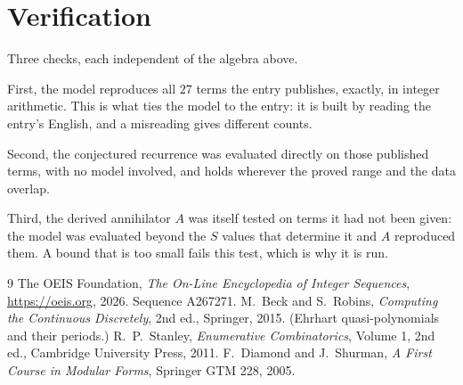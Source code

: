 \documentclass[11pt,a4paper]{article}
\theoremstyle{plain}
\theoremstyle{definition}
\begin{document}
\section{Verification}

Three checks, each independent of the algebra above.

First, the model reproduces all $27$ terms the entry publishes, exactly, in integer
arithmetic. This is what ties the model to the entry: it is built by reading the entry's
English, and a misreading gives different counts.

Second, the conjectured recurrence was evaluated directly on those published terms, with no
model involved, and holds wherever the proved range and the data overlap.

Third, the derived annihilator $A$ was itself tested on terms it had not been given: the model
was evaluated beyond the $S$ values that determine it and $A$ reproduced them. A bound that is
too small fails this test, which is why it is run.

\begin{thebibliography}{9}
 The OEIS Foundation, \emph{The On-Line Encyclopedia of Integer
Sequences}, \url{https://oeis.org}, 2026. Sequence A267271.
 M.~Beck and S.~Robins, \emph{Computing the Continuous Discretely},
2nd ed., Springer, 2015. (Ehrhart quasi-polynomials and their periods.)
 R.~P.~Stanley, \emph{Enumerative Combinatorics}, Volume 1, 2nd ed.,
Cambridge University Press, 2011.
 F.~Diamond and J.~Shurman, \emph{A First Course in Modular Forms},
Springer GTM 228, 2005.
\end{thebibliography}
\end{document}
